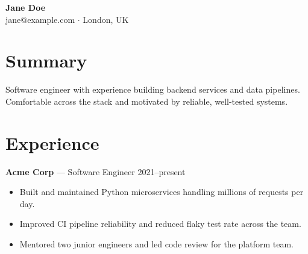 \documentclass[11pt]{article}
\begin{document}
\begin{center}
{\Large \textbf{Jane Doe}}\\
jane@example.com $\cdot$ London, UK
\end{center}

\section*{Summary}
Software engineer with experience building backend services and data pipelines.
Comfortable across the stack and motivated by reliable, well-tested systems.

\section*{Experience}
\textbf{Acme Corp} --- Software Engineer \hfill 2021--present
\begin{itemize}[leftmargin=*]
  \item Built and maintained Python microservices handling millions of requests per day.
  \item Improved CI pipeline reliability and reduced flaky test rate across the team.
  \item Mentored two junior engineers and led code review for the platform team.
\end{itemize}
\end{document}
